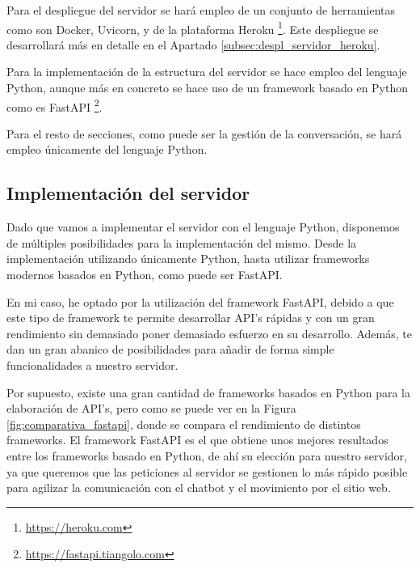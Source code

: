 Para el despliegue del servidor se hará empleo de un conjunto de herramientas como son Docker, Uvicorn, y de la plataforma Heroku \footnote{\url{https://heroku.com}}. Este despliegue se desarrollará más en detalle en el Apartado \ref{subsec:despl_servidor_heroku}.

Para la implementación de la estructura del servidor se hace empleo del lenguaje Python, aunque más en concreto se hace uso de un framework basado en Python como es FastAPI \footnote{\url{https://fastapi.tiangolo.com}}.

Para el resto de secciones, como puede ser la gestión de la conversación, se hará empleo únicamente del lenguaje Python.

\subsection{Implementación del servidor} \label{subsec:implementacion_controlador}

Dado que vamos a implementar el servidor con el lenguaje Python, disponemos de múltiples posibilidades para la implementación del mismo. Desde la implementación utilizando únicamente Python, hasta utilizar frameworks modernos basados en Python, como puede ser FastAPI.

En mi caso, he optado por la utilización del framework FastAPI, debido a que este tipo de framework te permite desarrollar API's rápidas y con un gran rendimiento sin demasiado poner demasiado esfuerzo en su desarrollo. Además, te dan un gran abanico de posibilidades para añadir de forma simple funcionalidades a nuestro servidor.

Por supuesto, existe una gran cantidad de frameworks basados en Python para la elaboración de API's, pero como se puede ver en la Figura \ref{fig:comparativa_fastapi}, donde se compara el rendimiento de distintos frameworks. El framework FastAPI es el que obtiene unos mejores resultados entre los frameworks basado en Python, de ahí su elección para nuestro servidor, ya que queremos que las peticiones al servidor se gestionen lo más rápido posible para agilizar la comunicación con el chatbot y el movimiento por el sitio web.


